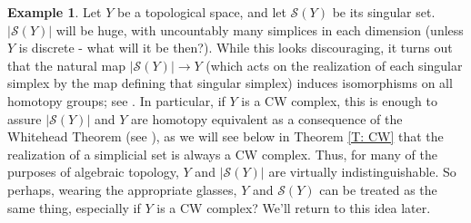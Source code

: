 \documentclass[12pt]{article}
\theoremstyle{plain}
\theoremstyle{definition}
\newtheorem{example}[theorem]{Example}
\newcommand{\ms}[1]{\mathscr{#1}}
\begin{document}
\begin{example}
Let $Y$ be a topological space, and let $\ms S(Y)$ be its singular set. $|\ms S(Y)|$ will be huge, with uncountably many simplices in each dimension (unless $Y$ is discrete - what will it be then?). While this looks discouraging, it turns out that  the natural map $|\ms S(Y)|\to Y$ (which acts on the realization  of each singular simplex by the map defining that singular simplex) induces isomorphisms on all homotopy  groups; see \cite[Theorem 4]{Mi57}. In particular, if $Y$ is a CW complex, this is enough to assure $|\ms S(Y)|$ and $Y$ are homotopy equivalent as a consequence of the Whitehead Theorem (see \cite[Corollary VII.11.14]{BRTG}), as we will see below in Theorem \ref{T: CW} that the realization of a simplicial set is always a CW complex. Thus, for many of the purposes of algebraic topology, $Y$ and $|\ms S(Y)|$ are virtually indistinguishable. So perhaps, wearing the appropriate glasses, $Y$ and $\ms S(Y)$ can be treated as the same thing, especially if $Y$ is a CW complex? We'll return to this idea later.
\end{example}
\end{document}
